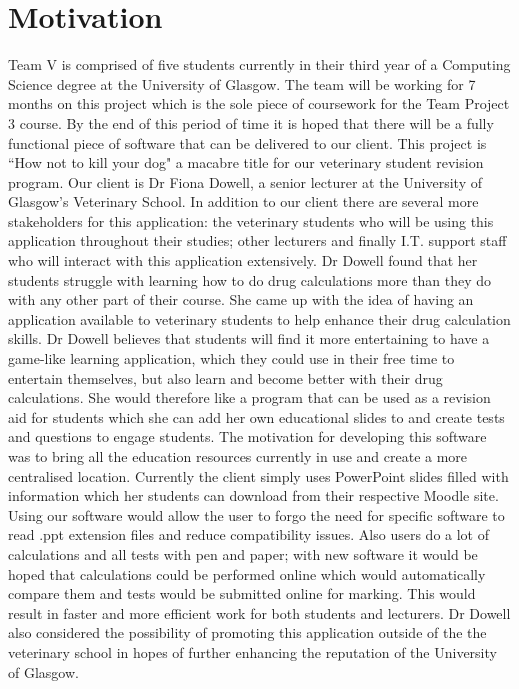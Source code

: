 \documentclass{l3proj}
\begin{document}
\section{Motivation}
Team V is comprised of five students currently in their third year of a Computing Science degree at the University of Glasgow. The team will be working for 7 months on this project which is the sole piece of coursework for the Team Project 3 course. By the end of this period of time it is hoped that there will be a fully functional piece of software that can be delivered to our client.
\newline
\newline
This project is ``How not to kill your dog" a macabre title for our veterinary student revision program. Our client is Dr Fiona Dowell, a senior lecturer at the University of Glasgow's Veterinary School. In addition to our client there are several more stakeholders for this application: the veterinary students who will be using this application throughout their studies; other lecturers and finally I.T. support staff who will interact with this application extensively.  Dr Dowell found that her students struggle with learning how to do drug calculations more than they do with any other part of their course. She came up with the idea of having an application available to veterinary students to help enhance their drug calculation skills.
\newline
\newline
Dr Dowell believes that students will find it more entertaining to have a game-like learning application, which they could use in their free time to entertain themselves, but also learn and become better with their drug calculations. She would therefore like a program that can be used as a revision aid for students which she can add her own educational slides to and create tests and questions to engage students.
\newline
\newline
The motivation for developing this software was to bring all the education resources currently in use and create a more centralised location. Currently the client simply uses PowerPoint slides filled with information which her students can download from their respective Moodle site. Using our software would allow the user to forgo the need for specific software to read .ppt extension files and reduce compatibility issues. Also users do a lot of calculations and all tests with pen and paper; with new software it would be hoped that calculations could be performed online which would automatically compare them and tests would be submitted online for marking. This would result in faster and more efficient work for both students and lecturers. Dr Dowell also considered the possibility of promoting this application outside of the the veterinary school in hopes of further enhancing the reputation of the University of Glasgow.
\end{document}
